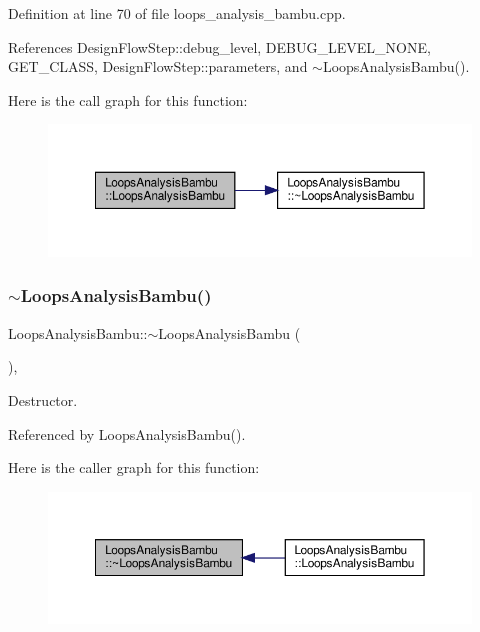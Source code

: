 Definition at line 70 of file loops\+\_\+analysis\+\_\+bambu.\+cpp.



References Design\+Flow\+Step\+::debug\+\_\+level, D\+E\+B\+U\+G\+\_\+\+L\+E\+V\+E\+L\+\_\+\+N\+O\+NE, G\+E\+T\+\_\+\+C\+L\+A\+SS, Design\+Flow\+Step\+::parameters, and $\sim$\+Loops\+Analysis\+Bambu().

Here is the call graph for this function\+:
\nopagebreak
\begin{figure}[H]
\begin{center}
\leavevmode
\includegraphics[width=350pt]{d5/d6d/classLoopsAnalysisBambu_a25111d0a00359cce1834b5a2362fc9fc_cgraph}
\end{center}
\end{figure}
\mbox{\label{classLoopsAnalysisBambu_a4d5bca07caaee5b94dfdbb93945b5c02}} 
\subsubsection{\texorpdfstring{$\sim$\+Loops\+Analysis\+Bambu()}{~LoopsAnalysisBambu()}}
{\footnotesize\ttfamily Loops\+Analysis\+Bambu\+::$\sim$\+Loops\+Analysis\+Bambu (\begin{DoxyParamCaption}{ }\end{DoxyParamCaption})\hspace{0.3cm}{\ttfamily [override]}, {\ttfamily [default]}}



Destructor. 



Referenced by Loops\+Analysis\+Bambu().

Here is the caller graph for this function\+:
\nopagebreak
\begin{figure}[H]
\begin{center}
\leavevmode
\includegraphics[width=350pt]{d5/d6d/classLoopsAnalysisBambu_a4d5bca07caaee5b94dfdbb93945b5c02_icgraph}
\end{center}
\end{figure}



